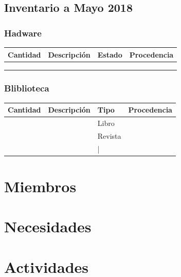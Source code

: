 \documentclass[a4paper,11pt]{article}                 %
\begin{document}
  \subsection{Inventario a Mayo 2018}
  \subsubsection{Hadware}
    \begin{table}[H]
    \centering
    \begin{tabular}{|c|l|l|l|}
    \hline
    Cantidad & Descripción & Estado & Procedencia \\ \hline
             &             &        &              \\ \hline
             &             &        &              \\ \hline
             &             &        &              \\ \hline
    \end{tabular}
    \end{table}
  \subsubsection{Bliblioteca}
    \begin{table}[H]
    \centering
    \begin{tabular}{|c|l|l|l|}
    \hline
    Cantidad & Descripción & Tipo & Procedencia \\ \hline
             &             & Libro   &              \\ \hline
             &             & Revista &              \\ \hline
             &             &        |&              \\ \hline
    \end{tabular}
    \end{table}
  \section{Miembros}
  \section{Necesidades}
  \section{Actividades}
  
  
  
   
  


\end{document}

